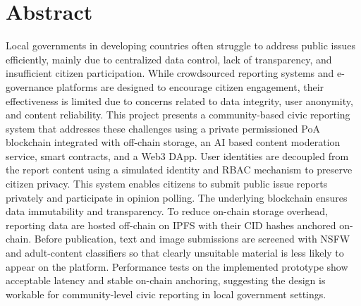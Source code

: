 \chapter*{Abstract}


Local governments in developing countries often struggle to address public issues efficiently, mainly due to centralized data control, lack of transparency, and insufficient citizen participation. While crowdsourced reporting systems and e-governance platforms are designed to encourage citizen engagement, their effectiveness is limited due to concerns related to data integrity, user anonymity, and content reliability. This project presents a community-based civic reporting system that addresses these challenges using a private permissioned \ac{PoA} blockchain integrated with off-chain storage, an \ac{AI} based content moderation service, smart contracts, and a Web3 \ac{DApp}. User identities are decoupled from the report content using a simulated identity and \ac{RBAC} mechanism to preserve citizen privacy. This system enables citizens to submit public issue
reports privately and participate in opinion polling. The underlying blockchain ensures data immutability and transparency. To reduce on-chain storage overhead, reporting data are hosted off-chain on \ac{IPFS} with their \ac{CID} hashes anchored on-chain. Before publication, text and image submissions are screened with \ac{NSFW} and adult-content classifiers so that clearly unsuitable material is less likely to appear on the platform.
Performance tests on the implemented prototype show acceptable latency and stable on-chain anchoring, suggesting the design is workable for community-level civic reporting in local government settings.


